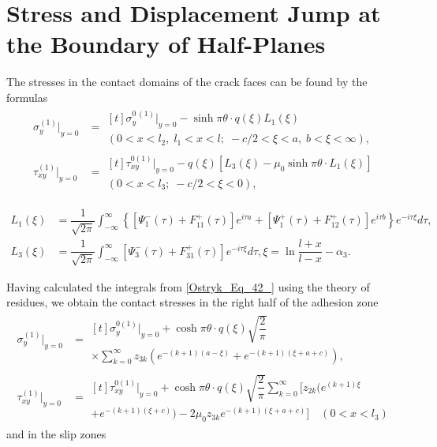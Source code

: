 \section{Stress and Displacement Jump at the Boundary of Half-Planes}

The stresses in the contact domains of the crack faces can be found by the formulas
\begin{equation} \label{Ostryk_Eq_42_} 
\begin{aligned}
	\sigma _{y}^{(1)} \big|_{y=0}& =
	\begin{multlined}[t]
		\sigma _{y}^{0\, (1)} \big|_{y=0} -\sinh \pi \theta \cdot q(\xi )L_{1} (\xi )
		\\
		(0<x<l_{2} ,\;  l_{1} <x<l;\;  -c/2 <\xi <a,\;  b<\xi <\infty ),
	\end{multlined}
	\\
	\tau _{xy}^{(1)} \big|_{y=0} &=
	\begin{multlined}[t]\tau _{xy}^{0(1)} \big|_{y=0} -q(\xi )\left[L_{3} (\xi )-\mu _{0} \sinh \pi \theta \cdot L_{1} (\xi )\right]  
		\\
		(0<x<l_{3} ; \; -c/2 <\xi <0),
	\end{multlined}
\end{aligned}
\end{equation} 


\begin{align*}
L_{1} (\xi )&=\dfrac{1}{\sqrt{2\pi } } \displaystyle\int _{-\infty }^{\infty }\left\{\left[\Psi _{1}^{-} (\tau )+F_{11}^{+} (\tau )\right]e^{i\tau a} +\left[\Psi _{1}^{+} (\tau )+F_{12}^{+} (\tau )\right]e^{i\tau b} \right\}e^{-i\tau \xi } d\tau  ,
\\
L_{3} (\xi )&=\dfrac{1}{\sqrt{2\pi } } \displaystyle\int _{-\infty }^{\infty }\left[\Psi _{3}^{-} (\tau )+F_{31}^{+} (\tau )\right]e^{-i\tau \xi } d\tau  ,    \xi =\ln \dfrac{l+x}{l-x} -\alpha _{3} .
\end{align*} 



Having calculated the integrals from \eqref{Ostryk_Eq_42_} using the theory of residues, we obtain the contact stresses in the right half of the adhesion zone
\begin{equation} \label{Ostryk_Eq_43_} 
\begin{aligned}
	\sigma _{y}^{(1)} \Big|_{y=0} &=
	\begin{multlined}[t]
		\sigma _{y}^{0 (1)} \Big|_{y=0} +\cosh \pi \theta \cdot q(\xi )\sqrt{\dfrac{2}{\pi } } 
		\\
		\times\sum _{k=0}^{\infty }z_{3k} \left(e^{-(k+1)(a-\xi )} +e^{-(k+1)(\xi +a+c)} \right) ,
	\end{multlined}
	\\
	\tau _{xy}^{(1)} \Big|_{y=0} &=
	\begin{multlined}[t]
		\tau _{xy}^{0 (1)} \Big|_{y=0} +\cosh \pi \theta \cdot q(\xi )\sqrt{\dfrac{2}{\pi } } \sum _{k=0}^{\infty }\Big[z_{2k} \Big(e^{(k+1)\xi } 
		\\
		+e^{-(k+1)(\xi +c)} \Big)-2\mu _{0} z_{3k} e^{-(k+1)(\xi +a+c)} \Big]\quad   (0<x<l_{3} )  
	\end{multlined}
\end{aligned}
\end{equation} 
and in the slip zones

